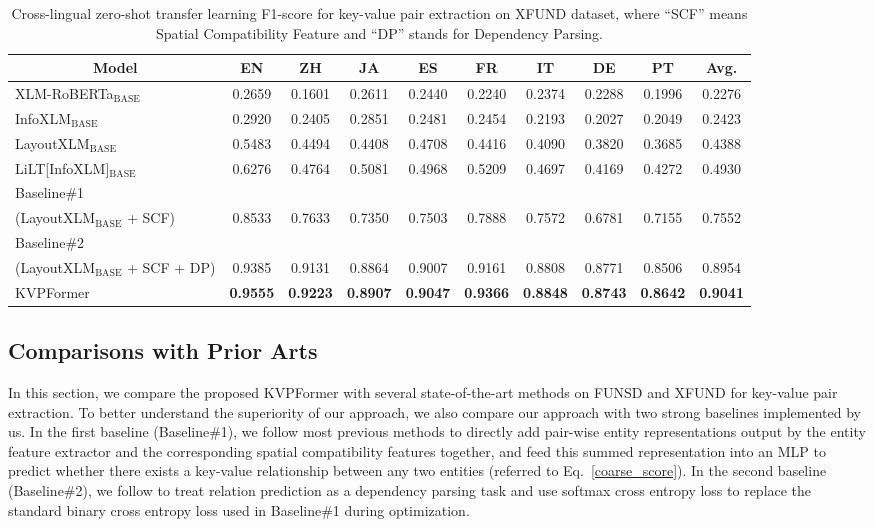 \documentclass[letterpaper]{article} %
\def \Ours {KVPFormer}
\begin{document}
\begin{table}[!]
\small
\centering
\begin{tabular}{lccccccccc}
\toprule
\multicolumn{1}{c}{\bf Model} & \bf EN & \bf ZH & \bf JA & \bf ES & \bf FR & \bf IT & \bf DE & \bf PT & \bf Avg. \\ \midrule \midrule
XLM-RoBERTa$_{\mathrm{BASE}}$ &  0.2659 &0.1601& 0.2611 &0.2440 &0.2240 &0.2374 &0.2288 &0.1996& 0.2276 \\
InfoXLM$_{\mathrm{BASE}}$ &  0.2920& 0.2405 &0.2851 &0.2481 &0.2454& 0.2193 &0.2027 &0.2049 &0.2423  \\
LayoutXLM$_{\mathrm{BASE}}$ &  0.5483& 0.4494& 0.4408 &0.4708 &0.4416 &0.4090 &0.3820& 0.3685 &0.4388  \\
LiLT[InfoXLM]$_{\mathrm{BASE}}$ & 0.6276&0.4764 & 0.5081 & 0.4968 & 0.5209  &  0.4697   & 0.4169  & 0.4272 & 0.4930 \\
Baseline\#1 \\
(LayoutXLM$_{\mathrm{BASE}}$ + SCF)
&    0.8533 &  0.7633 &  0.7350 &  0.7503 &  0.7888  & 0.7572 &  0.6781  & 0.7155 &  0.7552\\
Baseline\#2 \\
(LayoutXLM$_{\mathrm{BASE}}$ + SCF + DP)
& 0.9385 &  0.9131 &  0.8864 &  0.9007 &  0.9161  & 0.8808 &  0.8771  & 0.8506 &  0.8954 \\
\midrule \midrule
\Ours{} &   \bf 0.9555 & \bf 0.9223 & \bf 0.8907 & \bf 0.9047 & \bf 0.9366  & \bf 0.8848 & \bf 0.8743  & \bf 0.8642 &  \bf 0.9041 \\ \bottomrule
\end{tabular}
\caption{Cross-lingual zero-shot transfer learning F1-score for key-value pair extraction on XFUND dataset, where ``SCF'' means Spatial Compatibility Feature and ``DP'' stands for Dependency Parsing.}
\label{tab:xfunsd-zero-shot}
\end{table}

\subsection{Comparisons with Prior Arts}
In this section, we compare the proposed \Ours{} with several state-of-the-art methods on FUNSD and XFUND for key-value pair extraction. To better understand the superiority of our approach, we also compare our approach with two strong baselines implemented by us. In the first baseline (Baseline\#1), we follow most previous methods to directly add pair-wise entity representations output by the entity feature extractor and the corresponding spatial compatibility features together, and feed this summed representation into an MLP to predict whether there exists a key-value relationship between any two entities (referred to Eq.~\ref{coarse_score}). In the second baseline (Baseline\#2), we follow \cite{zhang2021entity} to treat relation prediction as a dependency parsing task and use softmax cross entropy loss to replace the standard binary cross entropy loss used in Baseline\#1 during optimization.
\end{document}
